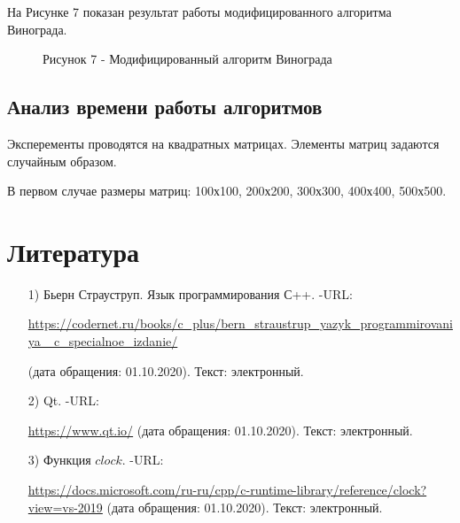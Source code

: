 \documentclass[12pt]{report}
\begin{document}
	\newpage
	На Рисунке 7 показан результат работы модифицированного алгоритма Винограда.
	\begin{figure}[h]
		\caption*{Рисунок 7 - Модифицированный алгоритм Винограда}
	\end{figure}
	
	
	\section{Анализ времени работы алгоритмов }
	Эксперементы проводятся на квадратных матрицах. Элементы матриц задаются случайным образом.\par
	В первом случае размеры матриц: 100х100, 200х200, 300х300, 400х400, 500х500. 
	
	
	
	
	
	
	
	
	
	
	
	\chapter*{Литература}
	
	\begin{enumerate}
		\label{CPlusPlus}
		\item[1)] Бьерн Страуструп. Язык программирования С++. -URL:\par 
		\href{https://codernet.ru/books/c_plus/bern_straustrup_yazyk_programmirovaniya_c_specialnoe_izdanie/}
		{https://codernet.ru/books/c\_plus/bern\_straustrup\_yazyk\_programmirovaniya\_
			c\_specialnoe\_izdanie/}\par(дата обращения:
		01.10.2020). Текст: электронный.
		
		\label{Cute}
		\item[2)] Qt. -URL:\par
		\href{https://www.qt.io/}{https://www.qt.io/} (дата обращения: 01.10.2020). Текст: электронный.
		
		\label{CLOCK}
		\item[3)] Функция $clock$. -URL:\par
		\href{https://docs.microsoft.com/ru-ru/cpp/c-runtime-library/reference/clock?view=vs-2019}{https://docs.microsoft.com/ru-ru/cpp/c-runtime-library/reference/clock?view=vs-2019} (дата обращения:
		01.10.2020). Текст: электронный.
		
	\end{enumerate}
	
\end{document}
